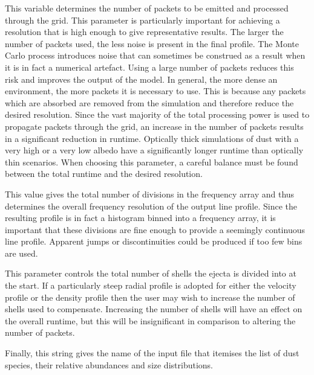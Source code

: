  This variable determines the number of packets to be emitted and processed through the grid.  This parameter is particularly important for achieving a resolution that is high enough to give representative results.  The larger the number of packets used, the less noise is present in the final profile.  The Monte Carlo process introduces noise that can sometimes be construed as a result when it is in fact a numerical artefact.  Using a large number of packets reduces this risk and improves the output of the model.  In general, the more dense an environment, the more packets it is necessary to use.  This is because any packets which are absorbed are removed from the simulation and therefore reduce the desired resolution.  Since the vast majority of the total processing power is used to propagate packets through the grid, an increase in the number of packets results in a significant reduction in runtime. Optically thick simulations of dust with a very high or a very low albedo have a significantly longer runtime than optically thin scenarios.  When choosing this parameter, a careful balance must be found between the total runtime and the desired resolution. 



 This value gives the total number of divisions in the frequency array and thus determines the overall frequency resolution of the output line profile.  Since the resulting profile is in fact a histogram binned into a frequency array, it is important that these divisions are fine enough to provide a seemingly continuous line profile.  Apparent jumps or discontinuities could be produced if too few bins are used.


 This parameter controls the total number of shells the ejecta is divided into at the start.  If a particularly steep radial profile is adopted for either the velocity profile or the density profile then the user may wish to increase the number of shells used to compensate.  Increasing the number of shells will have an effect on the overall runtime, but this will be insignificant in comparison to altering the number of packets.  


 Finally, this string gives the name of the input file that itemises the list of dust species, their relative abundances and size distributions.

